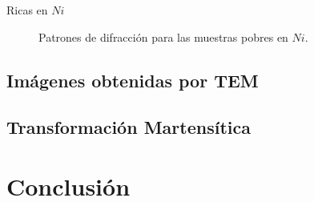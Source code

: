 \documentclass[11pt]{beamer}
\begin{document}
\begin{frame}{Ricas en $Ni$}
\begin{figure}[H]
				\caption{Patrones de difracción para las muestras pobres en $Ni$.}
				\label{RXNiRich}
			\end{figure}		
		\end{frame}
	\subsection{Imágenes obtenidas por TEM}
	\subsection{Transformación Martensítica}
\section{Conclusión}
\end{document}

